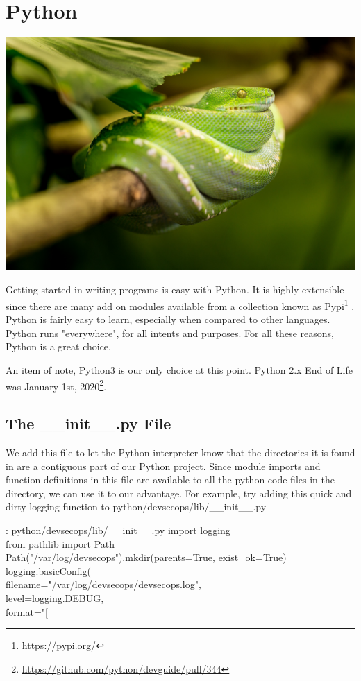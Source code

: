 \chapter{Python}

\includegraphics[scale=0.85]{../images/snake-1634293_1920.jpg}

\justify
Getting started in writing programs is easy with Python. It is highly extensible since there are many add on modules available from a collection known as Pypi\footnote{\url{https://pypi.org/}} . Python is
fairly easy to learn, especially when compared to other languages. Python runs "everywhere", for all intents and purposes. For all these reasons, Python is a great choice.

\justify
An item of note, Python3 is our only choice at this point. Python 2.x
End of Life was January 1st, 2020\footnote{\url{https://github.com/python/devguide/pull/344}}.


\section{The \_\_init\_\_.py File}

We add this file to let the Python interpreter know that the directories
it is found in are a contiguous part of our Python project. Since module
imports and function definitions in this file are available to all the
python code files in the directory, we can use it to our advantage. For
example, try adding this quick and dirty logging function to
python/devsecops/lib/\_\_init\_\_.py

\begin{mybox}{\thetcbcounter: python/devsecops/lib/\_\_init\_\_.py}
import logging\\
from pathlib import Path\\

Path("/var/log/devsecops").mkdir(parents=True, exist\_ok=True)\\
logging.basicConfig(\\
   filename="/var/log/devsecops/devsecops.log",\\
   level=logging.DEBUG,\\
   format="[%
\end{mybox}

